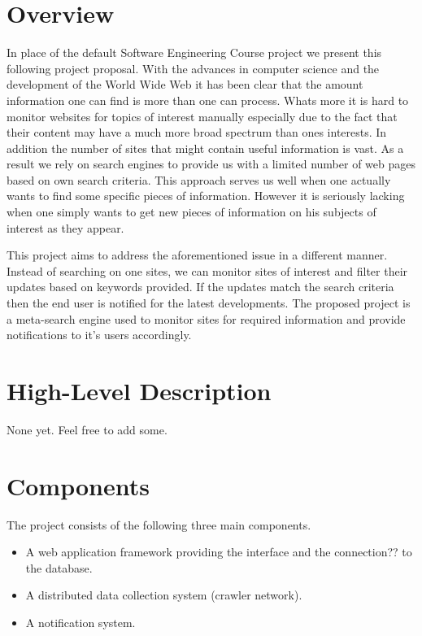 \documentclass[a4paper,10pt]{article} \usepackage{anysize}
\begin{document}



\section{Overview}
    In place of the default Software Engineering Course project we present this
    following project proposal. With the advances in computer science and the
    development of the World Wide Web it has been clear that the amount
    information one can find is more than one can process. Whats more it is
    hard to monitor websites for topics of interest manually especially due to
    the fact that their content may have a much more broad spectrum than ones
    interests. In addition the number of sites that might contain useful
    information is vast. As a result we rely on search engines to provide us
    with a limited number of web pages based on own search criteria. This
    approach serves us well when one actually wants to find some specific
    pieces of information. However it is seriously lacking when one simply
    wants to get new pieces of information on his subjects of interest as they
    appear. 

    This project aims to address the aforementioned issue in a different
    manner. Instead of searching on one sites, we can monitor sites of
    interest and filter their updates based on keywords provided. If the
    updates match the search criteria then the end user is notified for the
    latest developments. The proposed project is a meta-search engine used to
    monitor sites for required information and provide notifications to it's
    users accordingly. 

\section{High-Level Description}
    None yet. Feel free to add some.
\section{Components}
    The project consists of the following three main components.
    \begin{itemize}
        \item A web application framework providing the interface and the
            connection?? to the database.
        \item A distributed data collection system (crawler network).
        \item A notification system.
    \end{itemize}
\end{document}
